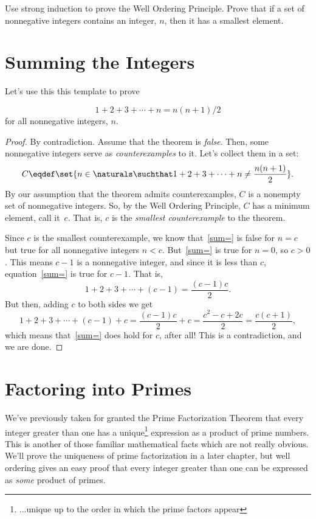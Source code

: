 \begin{notesproblem}
Use strong induction to prove the Well Ordering Principle. \hint Prove
that if a set of nonnegative integers contains an integer, $n$, then it
has a smallest element.
\end{notesproblem}
\fi

\section{Summing the Integers}
 Let's use this this template to prove %

\begin{theorem*}\label{sum-to-n}
\begin{equation}\label{sum=}
1 + 2 + 3 + \cdots + n = n(n+1)/2
\end{equation}
for all nonnegative integers, $n$.
\end{theorem*}

\begin{proof}
By contradiction.  Assume that the theorem is
\emph{false}.  Then, some nonnegative integers serve as
\emph{counterexamples} to it. Let's collect them in a set: 
\[
C \eqdef \set{n\in\naturals \suchthat 
        1 + 2 + 3 + \cdots + n \neq \frac{n(n+1)}{2}}.
\]
By our assumption that the theorem admits counterexamples, $C$ is a
nonempty set of nonnegative integers.  So, by the Well Ordering Principle,
$C$ has a minimum element, call it~$c$.  That is, $c$ is the
\emph{smallest counterexample} to the theorem.

Since $c$ is the smallest counterexample, we know that~\eqref{sum=} is
false for $n=c$ but true for all nonnegative integers $n<c$.
But~\eqref{sum=} is true for $n=0$, so $c > 0$.  This means $c-1$ is a
nonnegative integer, and since it is less than $c$, equation~\eqref{sum=}
is true for $c-1$.  That is,
\[
        1 + 2 + 3 + \cdots + (c-1) = \frac{(c-1)c}{2}.
\]
But then, adding $c$ to both sides we get
\[
1 + 2 + 3 + \cdots + (c-1) + c 
        = \frac{(c-1)c}{2} + c
        = \frac{c^2 - c + 2c}{2} 
        = \frac{c(c+1)}{2},
\]
which means that~\eqref{sum=} does hold for $c$, after all!  This is a
contradiction, and we are done.
\end{proof}

\section{Factoring into Primes}

We've previously taken for granted the Prime Factorization Theorem that
every integer greater than one has a unique\footnote{...unique up to the
  order in which the prime factors appear} expression as a product of
prime numbers.  This is another of those familiar mathematical facts which
are not really obvious.  We'll prove the uniqueness of prime factorization
in a later chapter, but well ordering gives an easy proof that every
integer greater than one can be expressed as \emph{some} product of
primes.

